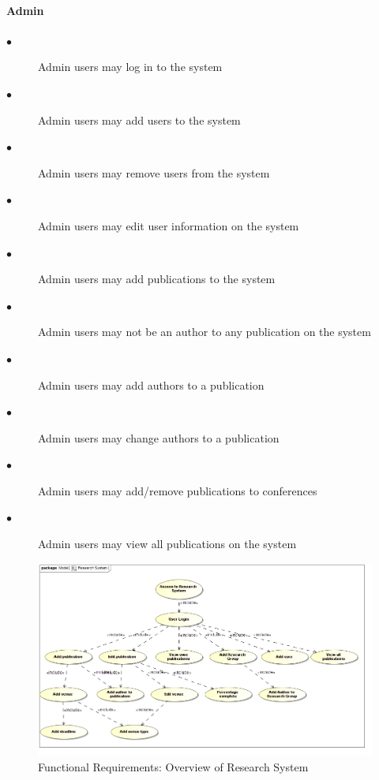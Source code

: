 \documentclass[a4paper]{article}
\begin{document}
	\paragraph{\textbf{Admin}}
	\begin{description}
		\item[$\bullet$] Admin users may log in to the system
		\item[$\bullet$] Admin users may add users to the system
		\item[$\bullet$] Admin users may remove users from the system
		\item[$\bullet$] Admin users may edit user information on the system
		\item[$\bullet$] Admin users may add publications to the system
		\item[$\bullet$] Admin users may not be an author to any publication on the system
		\item[$\bullet$] Admin users may add authors to a publication
		\item[$\bullet$] Admin users may change authors to a publication
		\item[$\bullet$] Admin users may add/remove publications to conferences
		\item[$\bullet$] Admin users may view all publications on the system
	\end{description}
	\begin{figure}[H]
		\includegraphics[width=\textwidth]{Overview.jpg}
		\caption{Functional Requirements: Overview of Research System \label{overflow}}
	\end{figure}
\end{document}
